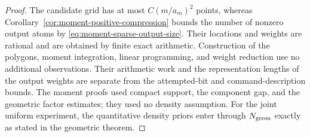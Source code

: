 \begin{proof}
The candidate grid has at most $C(m/a_m)^2$ points, whereas
Corollary~\ref{cor:moment-positive-compression} bounds the number
of nonzero output atoms by \eqref{eq:moment-sparse-output-size}.
Their locations and weights are rational and are obtained by
finite exact arithmetic.  Construction of the polygons, moment
integration, linear programming, and weight reduction use no
additional observations.  Their arithmetic work and the
representation lengths of the output weights are separate from
the attempted-bit and command-description bounds.  The moment
proofs used compact support, the component gap, and the geometric
factor estimates; they used no density assumption.  For the joint
uniform experiment, the quantitative density priors enter through
$N_{\rm geom}$ exactly as stated in the geometric theorem.
\end{proof}
